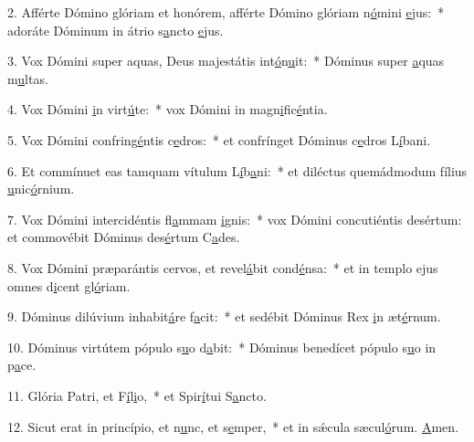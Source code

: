 2. Afférte Dómino glóriam et honórem, afférte Dómino glóriam n\uline{ó}mini \uline{e}jus:~* adoráte Dóminum in átrio s\uline{a}ncto \uline{e}jus.\par 
3. Vox Dómini super aquas, Deus majestátis int\uline{ó}n\uline{u}it:~* Dóminus super \uline{a}quas m\uline{u}ltas.\par 
4. Vox Dómini \uline{i}n virt\uline{ú}te:~* vox Dómini in magn\uline{i}fic\uline{é}ntia.\par 
5. Vox Dómini confring\uline{é}ntis c\uline{e}dros:~* et confrínget Dóminus c\uline{e}dros L\uline{í}bani.\par 
6. Et commínuet eas tamquam vítulum L\uline{í}b\uline{a}ni:~* et diléctus quemádmodum fílius \uline{u}nic\uline{ó}rnium.\par 
7. Vox Dómini intercidéntis fl\uline{a}mmam \uline{i}gnis:~* vox Dómini concutiéntis desértum: et commovébit Dóminus des\uline{é}rtum C\uline{a}des.\par 
8. Vox Dómini præparántis cervos, et revel\uline{á}bit cond\uline{é}nsa:~* et in templo ejus omnes d\uline{i}cent gl\uline{ó}riam.\par 
9. Dóminus dilúvium inhabit\uline{á}re f\uline{a}cit:~* et sedébit Dóminus Rex \uline{i}n æt\uline{é}rnum.\par 
10. Dóminus virtútem pópulo s\uline{u}o d\uline{a}bit:~* Dóminus benedícet pópulo s\uline{u}o in p\uline{a}ce.\par 
11. Glória Patri, et F\uline{í}l\uline{i}o,~* et Spir\uline{í}tui S\uline{a}ncto.\par 
12. Sicut erat in princípio, et n\uline{u}nc, et s\uline{e}mper,~* et in sǽcula sæcul\uline{ó}rum. \uline{A}men.\par 

